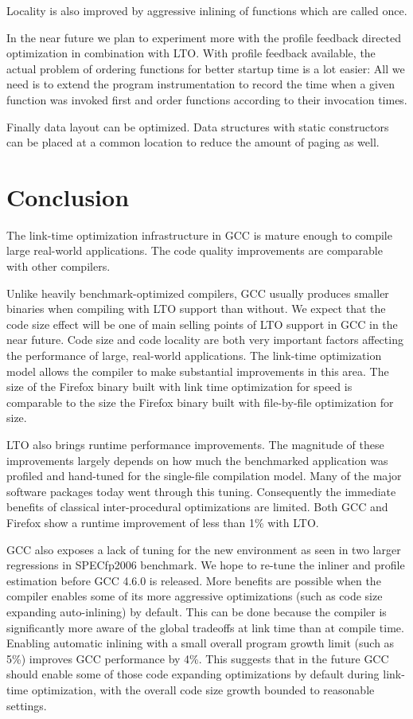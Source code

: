 \documentclass[final]{ols}
\begin{document}
Locality is also improved by aggressive inlining of functions which are called once.

In the near future we plan to experiment more with the profile feedback
directed optimization in combination with LTO.  With profile feedback
available, the actual problem of ordering functions for better startup time is
a lot easier: All we need is to extend the program instrumentation to record
the time when a given function was invoked first and order functions according
to their invocation times.

Finally data layout can be optimized.  Data structures with static constructors
can be placed at a common location to reduce the amount of paging as well. 


\section{Conclusion}
\label{Conclussion}
The link-time optimization infrastructure in GCC is mature enough to compile
large real-world applications.  The code quality improvements are comparable
with other compilers.  

Unlike heavily benchmark-optimized compilers, GCC usually produces smaller
binaries when compiling with LTO support than without.  We expect that the code size
effect will be one of main selling points of LTO support in GCC in the near
future. Code size and  code locality are both very important factors
affecting the performance of large, real-world applications.  The
link-time optimization model allows the compiler to make substantial
improvements in this area. The size of the Firefox binary built with link time
optimization for speed is comparable to the size the Firefox binary built
with file-by-file optimization for size.

LTO also brings runtime performance improvements.  The magnitude of these
improvements largely depends on how much the benchmarked application was
profiled and hand-tuned for the single-file compilation model.
Many of the major software packages today went through this tuning.  Consequently
the immediate benefits of classical inter-procedural optimizations are limited.
Both GCC and Firefox show a runtime improvement of less than 1\% with LTO.

GCC also exposes a lack of tuning for the new environment as seen in two
larger regressions in SPECfp2006 benchmark.  We hope to re-tune the inliner and
profile estimation before GCC 4.6.0 is released.  More benefits are possible
when the compiler enables some of its more aggressive optimizations (such as
code size expanding auto-inlining) by default.   This can be done because the compiler is significantly
more aware of the global tradeoffs at link time than at compile time.  Enabling automatic inlining with a small
overall program growth limit (such as 5\%) improves GCC performance by 4\%.
This suggests that in the future GCC should enable some of those code expanding
optimizations by default during link-time optimization, with the overall code size
growth bounded to reasonable settings.
\end{document}
